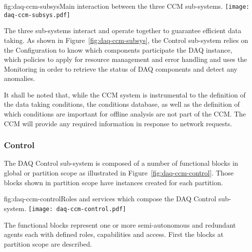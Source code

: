 \begin{dunefigure}{fig:daq-ccm-subsys}{Main interaction between the three CCM sub-systems.}
  \texttt{[image: daq-ccm-subsys.pdf]}
\end{dunefigure}

The three  sub-systems interact and operate together to guarantee efficient data taking.  As shown in Figure~\ref{fig:daq-ccm-subsys}, the Control sub-system relies on the Configuration to know which components participate the DAQ instance, which policies to apply for resource management and error handling and uses the Monitoring in order to retrieve the status of DAQ components and detect any anomalies.

It shall be noted that, while the CCM system is instrumental to the definition of the data taking conditions, the conditions database, as well as the definition of which conditions are important for offline analysis are not part of the CCM. The CCM will provide any required information in response to network requests.

\subsubsection{Control}
\label{sec:daq:design:ccm:control}

The DAQ Control sub-system is composed of a number of functional blocks in global or partition scope as illustrated in Figure~\ref{fig:daq-ccm-control}. 
Those blocks shown in partition scope have instances created for each partition. 


\begin{dunefigure}{fig:daq-ccm-control}{Roles and services which compose the DAQ Control sub-system.}
  \texttt{[image: daq-ccm-control.pdf]}
\end{dunefigure}

The functional blocks represent one or more semi-autonomous and redundant agents each with defined roles, capabilities and access.  First the blocks at partition scope are described.


